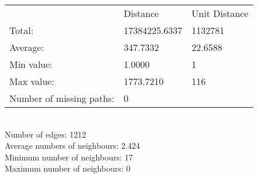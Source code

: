 \begin{tabular}{lll}
 & Distance & Unit Distance\\
Total: & 17384225.6337 & 1132781\\
Average: & 347.7332 & 22.6588\\
Min value: & 1.0000 & 1\\
Max value: & 1773.7210 & 116\\
\hline
Number of missing paths: & 0 &\\
\end{tabular}\\
Number of edges: 1212\\
Average numbers of neighbours: 2.424\\
Minimum number of neighbours: 17\\
Maximum number of neighbours: 0\\

